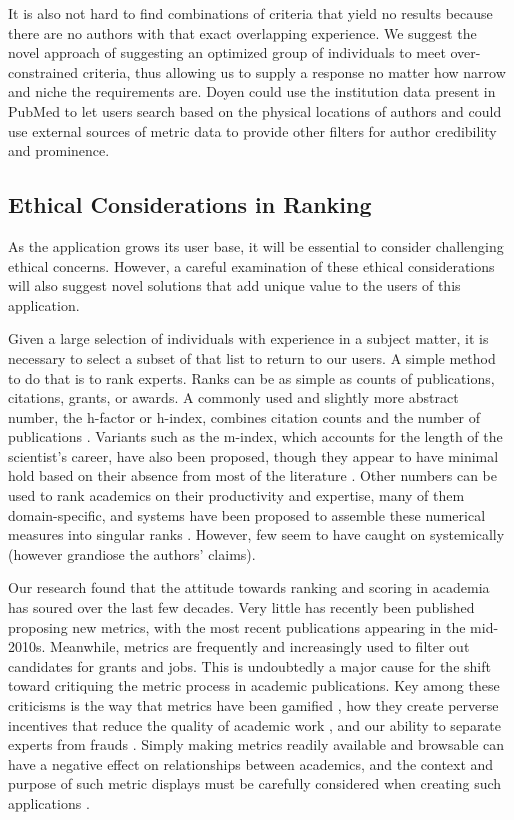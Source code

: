 It is also not hard to find combinations of criteria that yield no results because there are no authors with that exact overlapping experience. We suggest the novel approach of suggesting an optimized group of individuals to meet over-constrained criteria, thus allowing us to supply a response no matter how narrow and niche the requirements are. Doyen could use the institution data present in PubMed to let users search based on the physical locations of authors and could use external sources of metric data to provide other filters for author credibility and prominence. 

\subsection{Ethical Considerations in Ranking}

As the application grows its user base, it will be essential to consider challenging ethical concerns. However, a careful examination of these ethical considerations will also suggest novel solutions that add unique value to the users of this application. 

Given a large selection of individuals with experience in a subject matter, it is necessary to select a subset of that list to return to our users. A simple method to do that is to rank experts. Ranks can be as simple as counts of publications, citations, grants, or awards. A commonly used and slightly more abstract number, the h-factor or h-index, combines citation counts and the number of publications \cite{ref-metrics-methods-web}. Variants such as the m-index, which accounts for the length of the scientist's career, have also been proposed, though they appear to have minimal hold based on their absence from most of the literature \cite{ref-metrics-using-metrics}. Other numbers can be used to rank academics on their productivity and expertise, many of them domain-specific, and systems have been proposed to assemble these numerical measures into singular ranks \cite{ref-metrics-eval-biostat}. However, few seem to have caught on systemically (however grandiose the authors' claims). 

Our research found that the attitude towards ranking and scoring in academia has soured over the last few decades. Very little has recently been published proposing new metrics, with the most recent publications appearing in the mid-2010s. Meanwhile, metrics are frequently and increasingly used to filter out candidates for grants and jobs. This is undoubtedly a major cause for the shift toward critiquing the metric process in academic publications. Key among these criticisms is the way that metrics have been gamified \cite{ref-metrics-manipulation, ref-metrics-games-academics-play}, how they create perverse incentives that reduce the quality of academic work \cite{ref-metrics-neoliberalism}, and our ability to separate experts from frauds \cite{ref-metrics-perverse-incentives}. Simply making metrics readily available and browsable can have a negative effect on relationships between academics, and the context and purpose of such metric displays must be carefully considered when creating such applications \cite{ref-metrics-resviz}.

